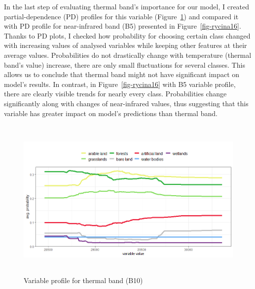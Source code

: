 \documentclass{amuthesis}
\begin{document}
In the last step of evaluating thermal band's importance for our model,
I created partial-dependence (PD) profiles for this variable
(Figure~\ref{fig-rycina15}) and compared it with PD profile for
near-infrared band (B5) presented in Figure~\ref{fig-rycina16}. Thanks
to PD plots, I checked how probability for choosing certain class
changed with increasing values of analysed variables while keeping other
features at their average values. Probabilities do not drastically
change with temperature (thermal band's value) increase, there are only
small fluctuations for several classes. This allows us to conclude that
thermal band might not have significant impact on model's results. In
contrast, in Figure~\ref{fig-rycina16} with B5 variable profile, there
are clearly visible trends for nearly every class. Probabilities change
significantly along with changes of near-infrared values, thus
suggesting that this variable has greater impact on model's predictions
than thermal band.

\begin{figure}[H]

{\centering \includegraphics[width=5.90625in,height=3.125in]{./figures/profB10.png}

}

\caption{\label{fig-rycina15}Variable profile for thermal band (B10)}

\end{figure}
\end{document}
